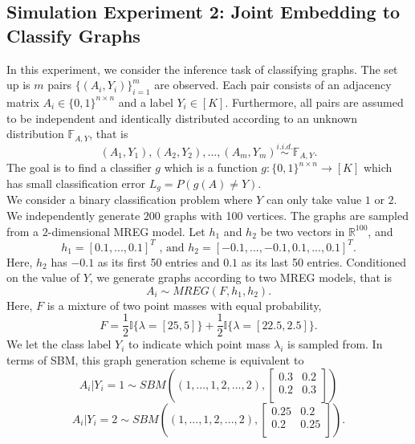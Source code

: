 \documentclass[10pt,journal,compsoc]{IEEEtran}
\begin{document}
\subsection{Simulation Experiment 2: Joint Embedding to Classify Graphs}
In this experiment, we consider the inference task of classifying graphs.  The set up is $m$ pairs $\{(A_i,Y_i)\}_{i=1}^{m}$ are observed. Each pair consists of an adjacency matrix $A_i \in \{0,1\}^{n \times n}$ and a label $Y_i \in [K]$. Furthermore, all pairs are assumed to be independent and identically distributed according to an unknown distribution $\mathbb{F}_{A,Y}$, that is
\[(A_1,Y_1),(A_2,Y_2),...,(A_m,Y_m) \overset{i.i.d.}{\sim} \mathbb{F}_{A,Y}. \] 
The goal is to find a classifier $g$ which is a function $g:\{0,1\}^{n \times n} \rightarrow [K]$ which has small classification error $L_g=P(g(A)\neq Y)$. \\ 

\noindent We consider a binary classification problem where $Y$ can only take value $1$ or $2$. We independently generate $200$ graphs with 100 vertices. The graphs are sampled from a $2$-dimensional MREG model. Let $h_1$ and $h_2$ be two vectors in $\mathbb{R}^{100}$, and \[h_1=[0.1,...,0.1]^T \text{ , and } h_2=[-0.1,...,-0.1,0.1,...,0.1]^T. \] 
Here, $h_2$ has $-0.1$ as its first 50 entries and $0.1$ as its last 50 entries. Conditioned on the value of $Y$, we generate graphs according to two MREG models, that is 
\begin{equation}
A_i \sim MREG(F,h_1,h_2).
\label{eq:simu}
\end{equation}
Here, $F$ is a mixture of two point masses with equal probability, 
\[ F = \frac{1}{2}\mathbb{I} \{\lambda=[25,5]\} + \frac{1}{2}\mathbb{I} \{\lambda=[22.5,2.5]\}.\]
We let the class label $Y_i$ to indicate which point mass $\lambda_i$ is sampled from. In terms of SBM, this graph generation scheme is equivalent to 
\[ A_i|Y_i=1 \sim  SBM((1,...,1,2,...,2),\begin{bmatrix} 0.3 & 0.2 \\ 0.2 & 0.3 \\ \end{bmatrix})  \]
\[ A_i|Y_i=2 \sim  SBM((1,...,1,2,...,2),\begin{bmatrix} 0.25 & 0.2 \\ 0.2 & 0.25 \\ \end{bmatrix}).\]
\end{document}
